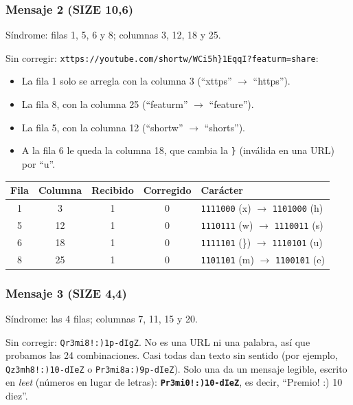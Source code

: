 \documentclass[11pt,a4paper]{article}
\begin{document}
\subsubsection*{Mensaje 2 (SIZE 10,6)}

Síndrome: filas 1, 5, 6 y 8; columnas 3, 12, 18 y 25.

Sin corregir: \texttt{xttps://youtube.com/shortw/WCi5h\}1EqqI?featurm=share}:
\begin{itemize}
  \item La fila 1 solo se arregla con la columna 3 (``xttps'' $\rightarrow$ ``https'').
  \item La fila 8, con la columna 25 (``featurm'' $\rightarrow$ ``feature'').
  \item La fila 5, con la columna 12 (``shortw'' $\rightarrow$ ``shorts'').
  \item A la fila 6 le queda la columna 18, que cambia la \texttt{\}} (inválida en una URL) por ``u''.
\end{itemize}

\begin{center}
\begin{tabular}{|c|c|c|c|l|}
\hline
\textbf{Fila} & \textbf{Columna} & \textbf{Recibido} & \textbf{Corregido} & \textbf{Carácter} \\
\hline
1 & 3 & 1 & 0 & \texttt{1111000} (x) $\rightarrow$ \texttt{1101000} (h) \\
5 & 12 & 1 & 0 & \texttt{1110111} (w) $\rightarrow$ \texttt{1110011} (s) \\
6 & 18 & 1 & 0 & \texttt{1111101} (\}) $\rightarrow$ \texttt{1110101} (u) \\
8 & 25 & 1 & 0 & \texttt{1101101} (m) $\rightarrow$ \texttt{1100101} (e) \\
\hline
\end{tabular}
\end{center}

\subsubsection*{Mensaje 3 (SIZE 4,4)}

Síndrome: las 4 filas; columnas 7, 11, 15 y 20.

Sin corregir: \texttt{Qr3mi8!:)1p-dIgZ}. No es una URL ni una palabra, así que probamos las 24 combinaciones. Casi todas dan texto sin sentido (por ejemplo, \texttt{Qz3mh8!:)10-dIeZ} o \texttt{Pr3mi8a:)9p-dIeZ}). Solo una da un mensaje legible, escrito en \textit{leet} (números en lugar de letras): \textbf{\texttt{Pr3mi0!:)10-dIeZ}}, es decir, ``Premio! :) 10 diez''.
\end{document}

